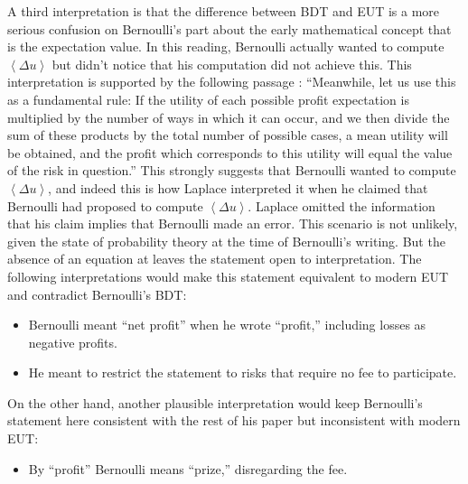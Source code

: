 \documentclass[pdftex]{article}
\newcommand{\ave}[1]{\left\langle#1 \right\rangle}
\newcommand{\bi}{\begin{itemize}}
\newcommand{\ei}{\end{itemize}}
\newcommand{\Du}{\Delta u}
\begin{document}
A third interpretation is that the difference between BDT and EUT is a more serious confusion on Bernoulli's part about the early mathematical concept that is the expectation value. In this reading,  Bernoulli actually wanted to compute $\ave{\Du}$ but didn't notice that his computation did not achieve this. This interpretation is supported by the following passage \cite[p.~24]{Bernoulli1738}: ``Meanwhile, let us use this as a fundamental rule: If the utility of each possible profit expectation is multiplied by the number of ways in which it can occur, and we then divide the sum of these products by the total number of possible cases, a mean utility will be obtained, and the profit which corresponds to this utility will equal the value of the risk in question.'' This strongly suggests that Bernoulli wanted to compute $\ave{\Du}$, and indeed this is how Laplace interpreted it when he claimed that Bernoulli had proposed to compute $\ave{\Du}$. Laplace omitted the information that his claim implies that Bernoulli made an error. This scenario is not unlikely, given the state of probability theory at the time of Bernoulli's writing. But the absence of an equation at \cite[p.~24]{Bernoulli1738} leaves the statement open to interpretation. The following interpretations would make this statement equivalent to modern EUT and contradict Bernoulli's BDT: 
\bi
\item
Bernoulli meant ``net profit'' when he wrote ``profit,'' including losses as negative profits. 
\item
He meant to restrict the statement to risks that require no fee to participate.
\ei

On the other hand, another plausible interpretation would keep Bernoulli's statement here consistent with the rest of his paper but inconsistent with modern EUT:
\bi
\item
By ``profit'' Bernoulli means ``prize,'' disregarding the fee.
\ei
\end{document}
